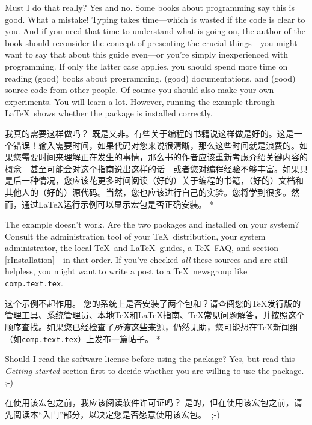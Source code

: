 \begin{advise}
\begin{paracol}{2}    
\item Must I do that really?
    \advisespace
    Yes and no. Some books about programming say this is good.
    What a mistake! Typing takes time---which is wasted if the code is clear to
    you. And if you need that time to understand what is going on, the
    author of the book should reconsider the concept of presenting the
    crucial things---you might want to say that about this guide even---or
    you're simply inexperienced with programming. If only the latter case
    applies, you should spend more time on reading (good) books about
    programming, (good) documentations, and (good) source code from other
    people. Of course you should also make your own experiments.
    You will learn a lot. However, running the example through \LaTeX\
    shows whether the  package is installed correctly.
    \switchcolumn
    \item 我真的需要这样做吗？
    \advisespace
    既是又非。有些关于编程的书籍说这样做是好的。这是一个错误！输入需要时间，如果代码对您来说很清晰，那么这些时间就是浪费的。如果您需要时间来理解正在发生的事情，那么书的作者应该重新考虑介绍关键内容的概念---甚至可能会对这个指南说出这样的话---或者您对编程经验不够丰富。如果只是后一种情况，您应该花更多时间阅读（好的）关于编程的书籍，（好的）文档和其他人的（好的）源代码。当然，您也应该进行自己的实验。您将学到很多。然而，通过\LaTeX 运行示例可以显示宏包是否正确安装。
\switchcolumn[0]*
\item The example doesn't work.
    \advisespace
    Are the two packages  and 
    installed on your system? Consult the administration tool of your
    \TeX\ distribution, your system administrator, the local \TeX\ and
    \LaTeX\ guides, a \TeX\ FAQ, and section \ref{rInstallation}---in
    that order. If you've checked \emph{all} these sources and are
    still helpless, you might want to write a post to a \TeX\ newsgroup
    like \texttt{comp.text.tex}.
    \switchcolumn
    \item 这个示例不起作用。
    \advisespace
    您的系统上是否安装了两个包和？请查阅您的\TeX 发行版的管理工具、系统管理员、本地\TeX 和\LaTeX 指南、\TeX 常见问题解答，并按照这个顺序查找。如果您已经检查了\emph{所有}这些来源，仍然无助，您可能想在\TeX 新闻组（如\texttt{comp.text.tex}）上发布一篇帖子。
    \switchcolumn[0]*    
\item Should I read the software license before using the package?
    \advisespace
    Yes, but read this \emph{Getting started} section first to decide
    whether you are willing to use the package.^^A ;-)
    \switchcolumn
    \item 在使用该宏包之前，我应该阅读软件许可证吗？
\advisespace
是的，但在使用该宏包之前，请先阅读本“入门”部分，以决定您是否愿意使用该宏包。^^A ;-)
\end{paracol}
\end{advise}